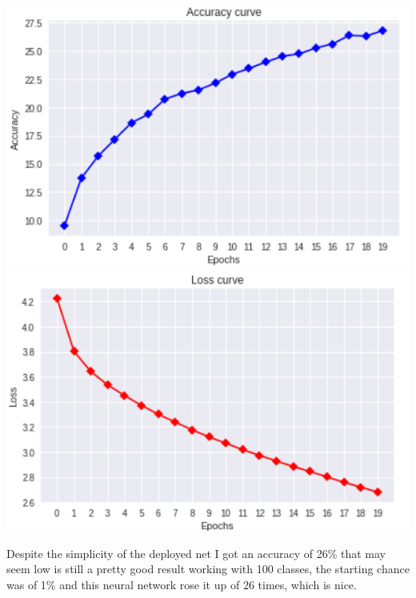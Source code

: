 \documentclass[11pt]{article}
\makeatletter
\def\maxwidth{\ifdim\Gin@nat@width>\linewidth\linewidth
  \else\Gin@nat@width\fi}
\let\Oldincludegraphics\includegraphics
\renewcommand{\includegraphics}[1]{\Oldincludegraphics[width=.8\maxwidth]{#1}}
\makeatother
\begin{document}
\begin{center}
  \includegraphics{1_acc.png}
  \includegraphics{1_loss.png}
\end{center}
Despite the simplicity of the deployed net I got an accuracy of 26\% that may seem low is still a pretty good result working with 100 classes, the starting chance was of 1\% and this neural network rose it up of 26 times, which is nice.
\newpage
\end{document}
